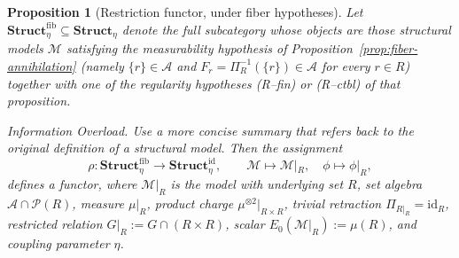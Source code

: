 \documentclass[11pt]{article}
\numberwithin{equation}{section}
\newtheorem{proposition}[theorem]{Proposition}
\theoremstyle{definition}
\begin{document}
\begin{proposition}[Restriction functor, under fiber hypotheses]\label{prop:restriction-functor}
Let $\mathbf{Struct}_{\eta}^{\mathrm{fib}}\subseteq\mathbf{Struct}_{\eta}$ denote the full subcategory whose objects are those structural models $\mathcal M$ satisfying the measurability hypothesis of Proposition~\ref{prop:fiber-annihilation} (namely $\{r\}\in\mathcal A$ and $F_r=\Pi_R^{-1}(\{r\})\in\mathcal A$ for every $r\in R$) together with one of the regularity hypotheses \emph{(R--fin)} or \emph{(R--ctbl)} of that proposition. 
\begin{structuralreview}[2]{Information Overload. Use a more concise summary that refers back to the original definition of a structural model. }
Then the assignment
\[
\rho:\mathbf{Struct}_{\eta}^{\mathrm{fib}}\longrightarrow\mathbf{Struct}^{\mathrm{id}}_{\eta},\qquad
\mathcal M\mapsto\mathcal M|_R,\quad \phi\mapsto\phi|_R,
\]
defines a functor, where $\mathcal M|_R$ is the model with underlying set $R$, set algebra $\mathcal A\cap\mathcal P(R)$, measure $\mu|_R$, product charge $\mu^{\otimes2}|_{R\times R}$, trivial retraction $\Pi_{R|_R}=\mathrm{id}_R$, restricted relation $G|_R:=G\cap(R\times R)$, scalar $E_0(\mathcal M|_R):=\mu(R)$, and coupling parameter $\eta$.
\end{structuralreview}
\end{proposition}
\end{document}
